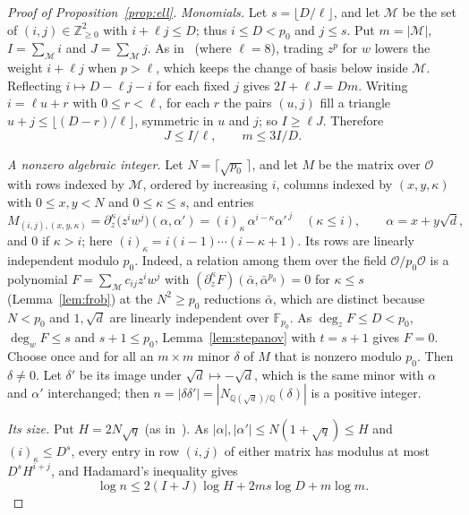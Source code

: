 \documentclass[11pt]{amsart}
\newcommand{\Z}{\mathbb{Z}}
\newcommand{\Q}{\mathbb{Q}}
\newcommand{\F}{\mathbb{F}}
\newcommand{\cO}{\mathcal{O}}
\newcommand{\cM}{\mathcal{M}}
\newcommand{\sd}{\sqrt{d}}
\begin{document}
\begin{proof}[Proof of Proposition~\ref{prop:ell}]
\emph{Monomials.} Let $s=\lfloor D/\ell\rfloor$, and let $\cM$ be the set of $(i,j)\in\Z_{\ge0}^2$
with $i+\ell j\le D$; thus $i\le D<p_0$ and $j\le s$. Put $m=|\cM|$, $I=\sum_\cM i$ and
$J=\sum_\cM j$. As in~\cite{Kerr} (where $\ell=8$), trading $z^p$ for $w$ lowers the weight $i+\ell j$ when
$p>\ell$, which keeps the change of basis below inside $\cM$. Reflecting $i\mapsto D-\ell j-i$ for
each fixed $j$ gives $2I+\ell J=Dm$. Writing $i=\ell u+r$ with $0\le r<\ell$, for each $r$ the
pairs $(u,j)$ fill a triangle $u+j\le\lfloor(D-r)/\ell\rfloor$, symmetric in $u$ and $j$; so
$I\ge\ell J$. Therefore
\begin{equation}\label{eq:counts}
J\le I/\ell,\qquad m\le3I/D.
\end{equation}

\emph{A nonzero algebraic integer.} Let $N=\lceil\sqrt{p_0}\,\rceil$, and let $M$ be the matrix over
$\cO$ with rows indexed by $\cM$, ordered by increasing $i$, columns indexed by $(x,y,\kappa)$ with
$0\le x,y<N$ and $0\le\kappa\le s$, and entries
\[
M_{(i,j),(x,y,\kappa)}=\partial_z^\kappa\bigl(z^iw^j\bigr)(\alpha,\alpha')
=(i)_\kappa\,\alpha^{i-\kappa}\alpha'^{\,j}\quad(\kappa\le i),\qquad\alpha=x+y\sd,
\]
and $0$ if $\kappa>i$; here $(i)_\kappa=i(i-1)\cdots(i-\kappa+1)$. Its rows are linearly
independent modulo $p_0$. Indeed, a relation among them over the field $\cO/p_0\cO$ is a polynomial
$F=\sum_\cM c_{ij}z^iw^j$ with $(\partial_z^\kappa F)(\bar\alpha,\bar\alpha^{p_0})=0$ for
$\kappa\le s$ (Lemma~\ref{lem:frob}) at the $N^2\ge p_0$ reductions $\bar\alpha$, which are distinct
because $N<p_0$ and $1,\sd$ are linearly independent over $\F_{p_0}$. As $\deg_zF\le D<p_0$,
$\deg_wF\le s$ and $s+1\le p_0$, Lemma~\ref{lem:stepanov} with $t=s+1$ gives $F=0$. Choose once and
for all an $m\times m$ minor $\delta$ of $M$ that is nonzero modulo $p_0$. Then $\delta\ne0$. Let $\delta'$ be its
image under $\sd\mapsto-\sd$, which is the same minor with $\alpha$ and $\alpha'$ interchanged; then
$n=|\delta\delta'|=|N_{\Q(\sd)/\Q}(\delta)|$ is a positive integer.

\emph{Its size.} Put $H=2N\sqrt q$ (as in~\cite[\S4]{Green}). As $|\alpha|,|\alpha'|\le N(1+\sqrt q)\le H$ and
$(i)_\kappa\le D^s$, every entry in row $(i,j)$ of either matrix has modulus at most
$D^sH^{i+j}$, and Hadamard's inequality gives
\begin{equation}\label{eq:upper}
\log n\le2(I+J)\log H+2ms\log D+m\log m.
\end{equation}


\end{proof}
\end{document}
